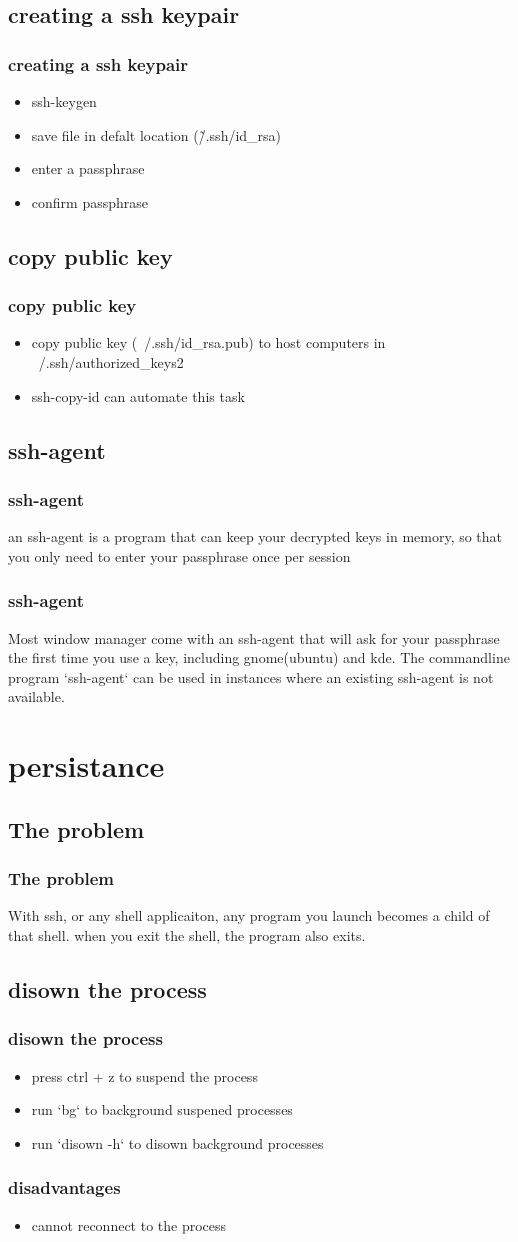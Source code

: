 \documentclass[hyperref={pdfpagelabels=false}]{beamer}
\begin{document}
\subsection{creating a ssh keypair}
\frame
{
    \frametitle{creating a ssh keypair}
    \begin{itemize}
    \item{ssh-keygen}
    \item{save file in defalt location (\~/.ssh/id\_rsa)}
    \item{enter a passphrase}
    \item{confirm passphrase}
    \end{itemize}
}
\subsection{copy public key}
\frame
{
    \frametitle{copy public key}
    \begin{itemize}
    \item{copy public key (~/.ssh/id\_rsa.pub) to host computers in ~/.ssh/authorized\_keys2}
    \item{ssh-copy-id can automate this task}
    \end{itemize}
}
\subsection{ssh-agent}
\frame
{
    \frametitle{ssh-agent}
    an ssh-agent is a program that can keep your decrypted keys in memory, so that you only need to enter your passphrase once per session
}
\frame
{
    \frametitle{ssh-agent}
    Most window manager come with an ssh-agent that will ask for your passphrase the first time you use a key, including gnome(ubuntu) and kde.  The commandline program `ssh-agent` can be used in instances where an existing ssh-agent is not available.
}
\section{persistance}
\subsection{The problem}
\frame
{
    \frametitle{The problem}
    With ssh, or any shell applicaiton, any program you launch becomes a child of that shell.  when you exit the shell, the program also exits.

}
\subsection{disown the process}
\frame
{
  \frametitle{disown the process}
  \begin{itemize}
  \item{press ctrl + z to suspend the process}
  \item{run `bg` to background suspened processes}
  \item{run `disown -h` to disown background processes}
  \end{itemize}
}
\frame
{
    \frametitle{disadvantages}
    \begin{itemize}
    \item{cannot reconnect to the process}
    \end{itemize}
}
\end{document}
